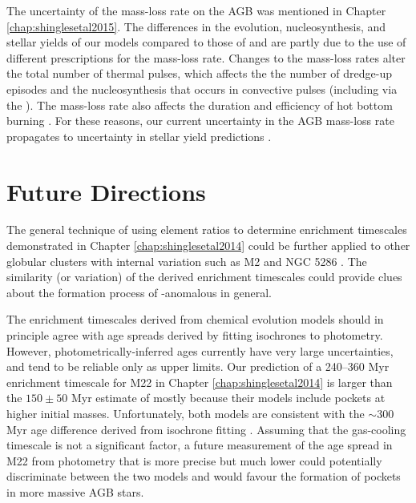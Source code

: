 The uncertainty of the mass-loss rate on the AGB was mentioned in Chapter \ref{chap:shinglesetal2015}. The differences in the evolution, nucleosynthesis, and stellar yields of our models compared to those of \citet{Straniero:2014jk} and \citet{Ventura:2009ha} are partly due to the use of different prescriptions for the mass-loss rate. Changes to the mass-loss rates alter the total number of thermal pulses, which affects the the number of dredge-up episodes and the nucleosynthesis that occurs in convective pulses (including via the \sprocess). The mass-loss rate also affects the duration and efficiency of hot bottom burning \citep{Ventura:2005ic}. For these reasons, our current uncertainty in the AGB mass-loss rate propagates to uncertainty in stellar yield predictions \citep{Stancliffe:2007er}.

\section{Future Directions}  %
The general technique of using \sprocess element ratios to determine enrichment timescales demonstrated in Chapter \ref{chap:shinglesetal2014} could be further applied to other globular clusters with internal \sprocess variation such as M2 \citep{Yong:2014dq} and NGC 5286 \citep{Marino:2015ed}. The similarity (or variation) of the derived enrichment timescales could provide clues about the formation process of \sprocess-anomalous in general.

The enrichment timescales derived from chemical evolution models should in principle agree with age spreads derived by fitting isochrones to photometry. However, photometrically-inferred ages currently have very large uncertainties, and tend to be reliable only as upper limits. Our prediction of a 240--360 Myr enrichment timescale for M22 in Chapter \ref{chap:shinglesetal2014} is larger than the $150 \pm 50$ Myr estimate of \citet{Straniero:2014jk} mostly because their models include  pockets at higher initial masses. Unfortunately, both models are consistent with the $\sim$300 Myr age difference derived from isochrone fitting \citep{Marino:2012db,Joo:2013dr}. Assuming that the gas-cooling timescale is not a significant factor, a future measurement of the age spread in M22 from photometry that is more precise but much lower could potentially discriminate between the two models and would favour the formation of  pockets in more massive AGB stars.

